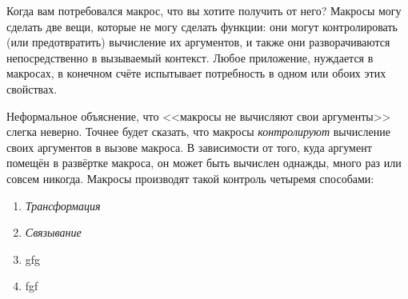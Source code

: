 \documentclass[12pt, a4paper]{article} %
\begin{document}
Когда вам потребовался макрос, что вы хотите получить от него? Макросы могу сделать две вещи, которые не могу сделать функции: они могут контролировать (или предотвратить) вычисление их аргументов, и также они разворачиваются непосредственно в вызываемый контекст. Любое приложение, нуждается в макросах, в конечном счёте испытывает потребность в одном или обоих этих свойствах.

Неформальное объяснение, что <<макросы не вычисляют свои аргументы>> слегка неверно. Точнее будет сказать, что макросы \textit{контролируют} вычисление своих аргументов в вызове макроса. В зависимости от того, куда аргумент помещён в развёртке макроса, он может быть вычислен однажды, много раз или совсем никогда. Макросы производят такой контроль четыремя способами:
\begin{enumerate}
    \item \textit{Трансформация}
    \item \textit{Связывание}
    \item gfg
    \item fgf
\end{enumerate}
\end{document}

